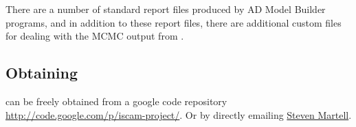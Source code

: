 \begin{multicols}{2}
 There are a number of standard report files produced by AD Model Builder programs, and in addition to these report files, there are additional custom files for dealing with the MCMC output from \iscam.


\subsection{Obtaining \iscam} %
\label{sub:obtaining_iscam}
\iscam can be freely obtained from a google code repository \url{http://code.google.com/p/iscam-project/}.  Or by directly emailing \href{mailto:s.martell@fisheries.ubc.ca}{Steven Martell}.




\end{multicols}










